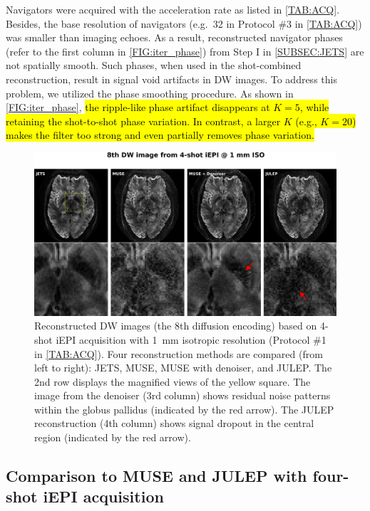\documentclass[preprint,12pt,authoryear,review]{elsarticle}
\begin{document}
    Navigators were acquired with the acceleration rate
    as listed in \cref{TAB:ACQ}.
    Besides, the base resolution of navigators
    (e.g.~32 in Protocol \#3 in \cref{TAB:ACQ})
    was smaller than imaging echoes.
    As a result, reconstructed navigator phases
    (refer to the first column in \cref{FIG:iter_phase})
    from Step I in \cref{SUBSEC:JETS}
    are not spatially smooth.
    Such phases, when used in the shot-combined reconstruction,
    result in signal void artifacts in DW images.
    To address this problem, we utilized the phase smoothing procedure.
    As shown in \cref{FIG:iter_phase},
    \hl{the ripple-like phase artifact disappears at $K = 5$,
    while retaining the shot-to-shot phase variation.
    In contrast, a larger $K$ (e.g., $K = 20$) makes the filter too strong
    and even partially removes phase variation.}

    \begin{figure}
        \centering
        \includegraphics[width=\textwidth]{../figures/fig4.png}
        \caption{Reconstructed DW images
        (the 8th diffusion encoding)
        based on 4-shot iEPI acquisition with 1~mm isotropic resolution
        (Protocol \#1 in \cref{TAB:ACQ}).
        Four reconstruction methods are compared (from left to right):
        JETS, MUSE, MUSE with denoiser, and JULEP.
        The 2nd row displays the magnified views of the yellow square.
        The image from the denoiser (3rd column)
        shows residual noise patterns
        within the globus pallidus (indicated by the red arrow).
        The JULEP reconstruction (4th column) shows signal dropout
        in the central region (indicated by the red arrow).}
        \label{FIG:4shot_comp}
    \end{figure}

    \subsection{Comparison to MUSE and JULEP with four-shot iEPI acquisition}
\end{document}
